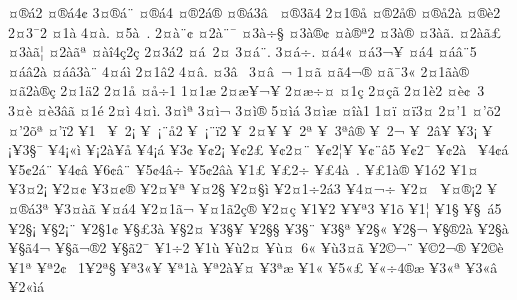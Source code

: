 {^^a4^^ae^^e12
^^a4^^ae^^e14^^a2
3^^a4^^ae^^e1^^a8
^^a4^^ae^^e14^^ad
^^a4^^ae2^^e1^^ae
^^a4^^ae^^e13^^e2^^a0^^ad
^^a4^^ae3^^e34
2^^a41^^ae^^e5
^^a4^^ae2^^e5^^ae
^^a4^^ae^^e52^^e0
^^a4^^ae^^e82
2^^a43^^af2
^^a41^^e0
4^^a4^^e0.
^^a45^^e0^^a0.
2^^a4^^e0^^a8^^a2
^^a42^^e0^^a8^^af
^^a43^^e0^^f7^^a7
^^a43^^e0^^ae^^a2
^^a4^^e0^^ae^^aa2
^^a43^^e0^^ae^^ad
^^a43^^e0^^e3.
^^a42^^e0^^e3^^a3
^^a43^^e0^^e3^^a6
^^a42^^e0^^e3^^aa
^^a4^^e0^^ee4^^e72^^e7
2^^a43^^e12
^^a4^^e1^^a02^^a4^^ad
3^^a4^^e1^^a8.
3^^a4^^e1^^f7.
^^a4^^e14^^ab
^^a4^^e13^^ac^^a5
^^a4^^e14^^ad
^^a4^^e1^^e2^^a85
^^a4^^e1^^e22^^e0
^^a4^^e1^^e23^^e0^^a8
4^^a4^^e1^^ec
2^^a41^^e22
4^^a4^^e2.
^^a43^^e2^^a0
3^^a4^^e2^^a0^^ac
1^^a4^^e3
^^a4^^e34^^ac^^ae
^^a4^^e3^^af3^^ab
2^^a41^^e3^^e0^^ae
^^a4^^e32^^e0^^ae^^e7
2^^a41^^e42
2^^a41^^e5
^^a4^^e5^^f71
1^^a41^^e6
2^^a4^^e6^^a5^^ac^^a5
2^^a4^^e6^^f7^^a4
^^a41^^e7
2^^a4^^e7^^e3
2^^a41^^e82
^^a4^^e8^^a2^^a03
3^^a4^^e8^^ad
^^a4^^e83^^e2^^e3
^^a41^^e9
2^^a4^^ec
4^^a4^^ec.
3^^a4^^ec^^aa
3^^a4^^ec^^ac
3^^a4^^ec^^ae
5^^a4^^ec^^e1
3^^a4^^ec^^e6
^^a4^^ee^^e01
1^^a4^^ef
^^a4^^ef3^^a4
2^^a4'1
^^a4'^^f52
^^a4'2^^f5^^aa
^^a4'^^ef2
^^a51^^a0
^^a5^^a02^^a1
^^a5^^a0^^a1^^a8^^e52
^^a5^^a0^^a1^^a8^^ef2
^^a5^^a02^^a4^^a5
^^a5^^a02^^aa
^^a5^^a03^^aa^^e2^^ae
^^a5^^a02^^ac
^^a5^^a02^^e2^^a5
^^a53^^a1
^^a5^^a1^^a53^^a7^^af
^^a54^^a1^^ab^^ec
^^a5^^a12^^e0^^a5^^e5
^^a54^^a1^^e1
^^a53^^a2
^^a5^^a22^^a1
^^a5^^a22^^a3
^^a5^^a22^^a4^^a8
^^a5^^a22^^a6^^a5
^^a5^^a2^^a8^^e25
^^a5^^a22^^af
^^a5^^a22^^e0^^a0
^^a54^^a2^^e1
^^a55^^a22^^e1^^a8
^^a54^^a2^^e2
^^a56^^a2^^e2^^a8
^^a55^^a24^^e2^^f7
^^a55^^a22^^e2^^e0
^^a51^^a3
^^a5^^a32^^ad^^f7
^^a5^^a34^^e0^^a0.
^^a5^^a31^^e0^^ae
^^a51^^f32
^^a51^^a4
^^a53^^a42^^a1
^^a52^^a4^^a2
^^a53^^a4^^a2^^ae
^^a52^^a4^^a5^^aa
^^a5^^a42^^a7
^^a52^^a4^^a7^^ec
^^a52^^a41^^f72^^e13
^^a54^^a4^^ac^^f7
^^a52^^a4^^ad^^a0
^^a5^^a4^^ae^^a12
^^a5^^a4^^ae^^e13^^aa
^^a53^^a4^^e0^^e3
^^a5^^a4^^e14
^^a52^^a41^^e3^^ac
^^a5^^a41^^e32^^e7^^ae
^^a52^^a4^^e7
^^a51^^a52
^^a5^^a5^^aa3
^^a51^^f5
^^a51^^a6
^^a51^^a7
^^a5^^a7^^a0^^e15
^^a52^^a7^^a1
^^a5^^a72^^a1^^a8
^^a52^^a71^^a2
^^a5^^a7^^a33^^e0
^^a5^^a72^^a4
^^a53^^a7^^a5
^^a52^^a7^^a7
^^a53^^a7^^a8
^^a53^^a7^^aa
^^a52^^a7^^ab
^^a52^^a7^^ac
^^a5^^a7^^ae2^^e0
^^a52^^a7^^e0
^^a5^^a7^^e34^^ac
^^a5^^a7^^e3^^ac^^ae2
^^a5^^a7^^e32^^af
^^a51^^f72
^^a51^^f9
^^a5^^f92^^a4
^^a5^^f9^^a4^^a06^^ab
^^a5^^f93^^a4^^e3
^^a52^^a9^^ac^^a8
^^a5^^a92^^ac^^ae
^^a52^^a9^^e8
^^a51^^aa
^^a5^^aa2^^a2^^a0
1^^a52^^aa^^a7
^^a5^^aa3^^ab^^a5
^^a5^^aa1^^e0
^^a5^^aa2^^e0^^a5^^a4
^^a53^^aa^^e6
^^a51^^ab
^^a55^^ab^^a3
^^a5^^ab^^f74^^ae^^e6
^^a53^^ab^^aa
^^a53^^ab^^e2
^^a52^^ab^^ec^^e1
}
